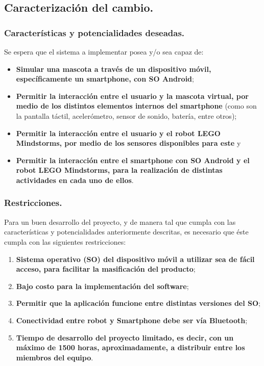 \newpage
\subsection{Caracterizaci\'on del cambio.}
\subsubsection{Caracter\'isticas y potencialidades deseadas.}

Se espera que el sistema a implementar posea y/o sea capaz de:
\begin{itemize}
\item {\bf Simular una mascota a trav\'es de un dispositivo m\'ovil, espec\'ificamente un smartphone, con SO Android};
\item {\bf Permitir la interacci\'on entre el usuario y la mascota virtual, por medio de los distintos elementos internos del smartphone} (como son la pantalla t\'actil, aceler\'ometro, sensor de sonido, bater\'ia, entre otros);
\item {\bf Permitir la interacci\'on entre el usuario y el robot LEGO Mindstorms, por medio de los sensores disponibles para este} y
\item {\bf Permitir la interacci\'on entre el smartphone con SO Android y el robot LEGO Mindstorms, para la realizaci\'on de distintas actividades en cada uno de ellos}.
\end{itemize}

\subsubsection{Restricciones.}

Para un buen desarrollo del proyecto, y de manera tal que cumpla con las caracter\'isticas y potencialidades anteriormente descritas, es necesario que \'este cumpla con las siguientes restricciones:
\begin{enumerate}
\item {\bf Sistema operativo (SO) del dispositivo m\'ovil a utilizar sea de f\'acil acceso, para facilitar la masificaci\'on del producto};
\item {\bf Bajo costo para la implementaci\'on del software};
\item {\bf Permitir que la aplicaci\'on funcione entre distintas versiones del SO};
\item {\bf Conectividad entre robot y Smartphone debe ser v\'ia Bluetooth};
\item {\bf Tiempo de desarrollo del proyecto limitado, es decir, con un m\'aximo de 1500 horas, aproximadamente, a distribuir entre los miembros del equipo}.
\end{enumerate}

